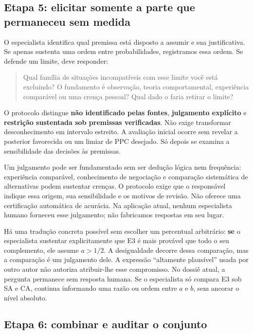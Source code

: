 \documentclass[
  brazilian,
  11pt,
  a4paper,
]{article}
\begin{document}
\subsection{Etapa 5: elicitar somente a parte que permaneceu sem
medida}\label{etapa-5-elicitar-somente-a-parte-que-permaneceu-sem-medida}

O especialista identifica qual premissa está disposto a assumir e sua
justificativa. Se apenas sustenta uma ordem entre probabilidades,
registramos essa ordem. Se defende um limite, deve responder:

\begin{quote}
Qual família de situações incompatíveis com esse limite você está
excluindo? O fundamento é observação, teoria comportamental, experiência
comparável ou uma crença pessoal? Qual dado o faria retirar o limite?
\end{quote}

O protocolo distingue \textbf{não identificado pelas fontes},
\textbf{julgamento explícito} e \textbf{restrição sustentada sob
premissas verificadas}. Não exige transformar desconhecimento em
intervalo estreito. A avaliação inicial ocorre sem revelar a posterior
favorecida ou um limiar de PPC desejado. Só depois se examina a
sensibilidade das decisões às premissas.

Um julgamento pode ser fundamentado sem ser dedução lógica nem
frequência: experiência comparável, conhecimento de negociação e
comparação sistemática de alternativas podem sustentar crenças. O
protocolo exige que o responsável indique essa origem, sua sensibilidade
e os motivos de revisão. Não oferece uma certificação automática de
acurácia. Na aplicação atual, nenhum especialista humano forneceu esse
julgamento; não fabricamos respostas em seu lugar.

Há uma tradução concreta possível sem escolher um percentual arbitrário:
\textbf{se} o especialista sustentar explicitamente que E3 é mais
provável que todo o seu complemento, ele assume \(a>1/2\). A
desigualdade decorre dessa comparação, mas a comparação é um julgamento
dele. A expressão ``altamente plausível'' usada por outro autor não
autoriza atribuir-lhe esse compromisso. No dossiê atual, a pergunta
permanece sem resposta humana. Se o especialista só compara E3 sob SA e
CA, continua informando uma razão ou ordem entre \(a\) e \(b\), sem
ancorar o nível absoluto.

\subsection{Etapa 6: combinar e auditar o
conjunto}\label{etapa-6-combinar-e-auditar-o-conjunto}
\end{document}
